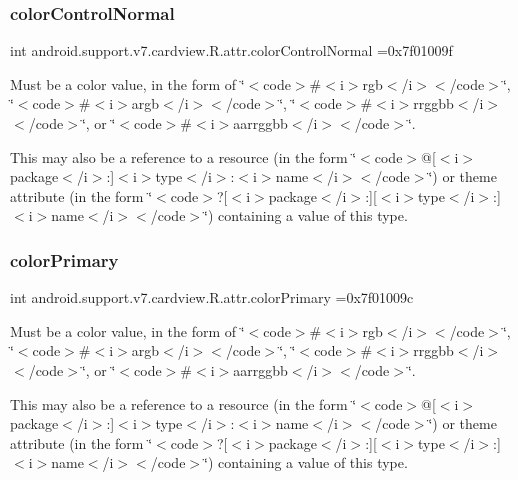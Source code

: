 \subsubsection{\texorpdfstring{color\+Control\+Normal}{colorControlNormal}}
{\footnotesize\ttfamily int android.\+support.\+v7.\+cardview.\+R.\+attr.\+color\+Control\+Normal =0x7f01009f\hspace{0.3cm}{\ttfamily [static]}}

Must be a color value, in the form of \char`\"{}$<$code$>$\#$<$i$>$rgb$<$/i$>$$<$/code$>$\char`\"{}, \char`\"{}$<$code$>$\#$<$i$>$argb$<$/i$>$$<$/code$>$\char`\"{}, \char`\"{}$<$code$>$\#$<$i$>$rrggbb$<$/i$>$$<$/code$>$\char`\"{}, or \char`\"{}$<$code$>$\#$<$i$>$aarrggbb$<$/i$>$$<$/code$>$\char`\"{}. 

This may also be a reference to a resource (in the form \char`\"{}$<$code$>$@\mbox{[}$<$i$>$package$<$/i$>$\+:\mbox{]}$<$i$>$type$<$/i$>$\+:$<$i$>$name$<$/i$>$$<$/code$>$\char`\"{}) or theme attribute (in the form \char`\"{}$<$code$>$?\mbox{[}$<$i$>$package$<$/i$>$\+:\mbox{]}\mbox{[}$<$i$>$type$<$/i$>$\+:\mbox{]}$<$i$>$name$<$/i$>$$<$/code$>$\char`\"{}) containing a value of this type. \mbox{\label{classandroid_1_1support_1_1v7_1_1cardview_1_1R_1_1attr_a5c781c3fb7e3cdf20c9e9975e9b8b63f}} 
\subsubsection{\texorpdfstring{color\+Primary}{colorPrimary}}
{\footnotesize\ttfamily int android.\+support.\+v7.\+cardview.\+R.\+attr.\+color\+Primary =0x7f01009c\hspace{0.3cm}{\ttfamily [static]}}

Must be a color value, in the form of \char`\"{}$<$code$>$\#$<$i$>$rgb$<$/i$>$$<$/code$>$\char`\"{}, \char`\"{}$<$code$>$\#$<$i$>$argb$<$/i$>$$<$/code$>$\char`\"{}, \char`\"{}$<$code$>$\#$<$i$>$rrggbb$<$/i$>$$<$/code$>$\char`\"{}, or \char`\"{}$<$code$>$\#$<$i$>$aarrggbb$<$/i$>$$<$/code$>$\char`\"{}. 

This may also be a reference to a resource (in the form \char`\"{}$<$code$>$@\mbox{[}$<$i$>$package$<$/i$>$\+:\mbox{]}$<$i$>$type$<$/i$>$\+:$<$i$>$name$<$/i$>$$<$/code$>$\char`\"{}) or theme attribute (in the form \char`\"{}$<$code$>$?\mbox{[}$<$i$>$package$<$/i$>$\+:\mbox{]}\mbox{[}$<$i$>$type$<$/i$>$\+:\mbox{]}$<$i$>$name$<$/i$>$$<$/code$>$\char`\"{}) containing a value of this type. \mbox{\label{classandroid_1_1support_1_1v7_1_1cardview_1_1R_1_1attr_a715999d97332e449ff29b09233a24854}} 
